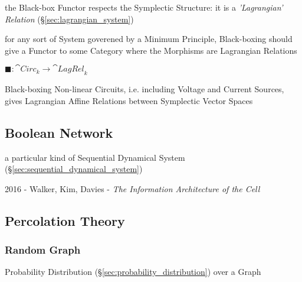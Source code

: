 the Black-box Functor respects the Symplectic Structure: it is a
\emph{'Lagrangian' Relation} (\S\ref{sec:lagrangian_system})

for any sort of System goverened by a Minimum Principle, Black-boxing should
give a Functor to some Category where the Morphisms are Lagrangian Relations

$\blacksquare : \cat{Circ}_k \rightarrow \cat{LagRel}_k$

Black-boxing Non-linear Circuits, i.e. including Voltage and Current Sources,
gives Lagrangian Affine Relations between Symplectic Vector Spaces



\subsection{Boolean Network}\label{sec:boolean_network}


a particular kind of Sequential Dynamical System
(\S\ref{sec:sequential_dynamical_system})

2016 - Walker, Kim, Davies - \emph{The Information Architecture of the Cell}



\subsection{Percolation Theory}\label{sec:percolation_theory}

\subsubsection{Random Graph}\label{sec:random_graph}

Probability Distribution (\S\ref{sec:probability_distribution}) over a Graph
